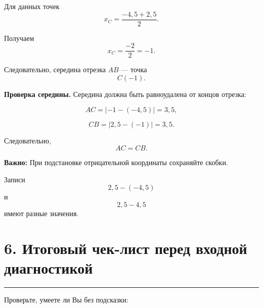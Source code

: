 \documentclass[a4paper,12pt]{article}
\newcommand{\sectionline}{
  \par
  \vspace{-0.35em}
  {\color{accent}\rule{\linewidth}{0.5pt}}
  \vspace{0.55em}
}
\newcommand{\skill}[1]{\textbf{\color{darkaccent}#1}}
\newcommand{\warn}[1]{\textbf{Важно:} #1}
\begin{document}
Для данных точек
\[
x_C
=
\frac{-4,5+2,5}{2}.
\]

Получаем
\[
x_C
=
\frac{-2}{2}
=
-1.
\]

Следовательно, середина отрезка $AB$ ---
точка
\[
C(-1).
\]

\skill{Проверка середины.}
Середина должна быть равноудалена от концов отрезка:

\[
AC
=
|-1-(-4,5)|
=
3,5,
\]

\[
CB
=
|2,5-(-1)|
=
3,5.
\]

Следовательно,
\[
AC=CB.
\]

\warn{При подстановке отрицательной координаты сохраняйте скобки.}

Записи
\[
2,5-(-4,5)
\]
и
\[
2,5-4,5
\]
имеют разные значения.


\section*{6. Итоговый чек-лист перед входной диагностикой}
\sectionline

Проверьте, умеете ли Вы без подсказки:
\end{document}
